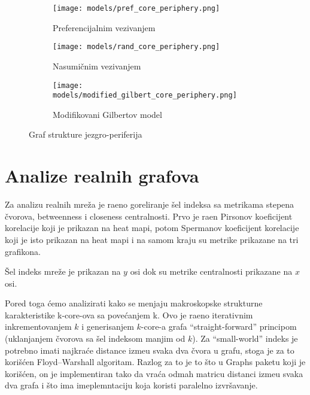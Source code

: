 \documentclass[11pt,a4paper]{article}
\begin{document}
\begin{figure}
    \centering
    \begin{subfigure}{.3\textwidth}
        \centering
        \texttt{[image: models/pref\_core\_periphery.png]}
        \caption{Preferencijalnim vezivanjem}
        \label{fig:pref-core-periph}
    \end{subfigure}
    \hfill
    \begin{subfigure}{.3\textwidth}
        \centering
        \texttt{[image: models/rand\_core\_periphery.png]}
        \caption{Nasumi\v cnim vezivanjem}
        \label{fig:rand-core-periph}
    \end{subfigure}
    \hfill
    \begin{subfigure}{.3\textwidth}
        \centering
        \texttt{[image: models/modified\_gilbert\_core\_periphery.png]}
        \caption{Modifikovani Gilbertov model}
        \label{fig:modif-gilbert-core-periph}
    \end{subfigure}
    \caption{Graf strukture jezgro-periferija}
    \label{fig:core-periph}
\end{figure}

\section{Analize realnih grafova}

Za analizu realnih mre\v za je ra\dj eno goreliranje \v sel indeksa sa metrikama stepena \v cvorova, betweenness i closeness centralnosti. Prvo je ra\dj en Pirsonov koeficijent korelacije koji je prikazan na heat mapi, potom Spermanov koeficijent korelacije koji je isto prikazan na heat mapi i na samom kraju su metrike prikazane na tri grafikona.

\v Sel indeks mre\v ze je prikazan na $ y $ osi dok su metrike centralnosti prikazane na $ x $ osi.

Pored toga \' cemo analizirati kako se menjaju makroskopske strukturne karakteristike k-core-ova sa pove\' canjem k. Ovo je ra\dj eno iterativnim inkrementovanjem $ k $ i generisanjem $ k $-core-a grafa ``straight-forward'' principom (uklanjanjem \v cvorova sa \v sel indeksom manjim od $ k $). Za ``small-world'' indeks je potrebno imati najkra\' ce distance izme\dj u svaka dva \v cvora u grafu, stoga je za to kori\v s\' cen Floyd–Warshall algoritam. Razlog za to je to \v sto u Graphs paketu koji je kori\v s\' cen, on je implementiran tako da vra\' ca odmah matricu distanci izme\dj u svaka dva grafa i \v sto ima imeplemntaciju koja koristi paralelno izvr\v savanje.
\end{document}
